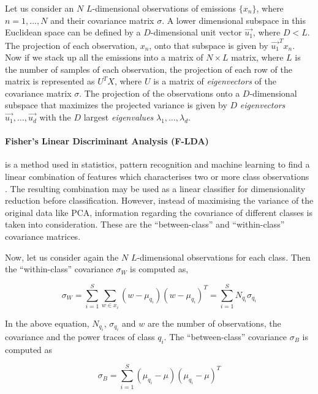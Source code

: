 \documentclass[lnicst]{svmultln}
\begin{document}
Let us consider an $N$ $L$-dimensional observations of emissions $\{x_{n}\}$, where $n=1,...,N$ and their covariance matrix $\sigma$. A lower dimensional subspace in this Euclidean space can be defined by a $D$-dimensional unit vector $\overrightarrow{u_{1}}$, where $D < L$. The projection of each observation, $x_{n}$, onto that subspace is given by $\overrightarrow{u_{1}}^{T} x_{n}$. Now if we stack up all the emissions into a matrix of $N\times L$ matrix, where $L$ is the number of samples of each observation, the projection of each row of the matrix is represented as $U^{T} X$, where $U$ is a matrix of \emph{eigenvectors} of the covariance matrix $\sigma$. The projection of the observations onto a $D$-dimensional subspace that maximizes the projected variance is given by $D$ \emph{eigenvectors}~\cite{ILA-03-GS} $\overrightarrow{u_{1}},\dots, \overrightarrow{u_{d}}$ with the $D$ largest \emph{eigenvalues} $\lambda_{1},\dots,\lambda_{d}$.

\paragraph{\textbf{Fisher's Linear Discriminant Analysis (F-LDA)}} is a method used in statistics, pattern recognition and machine learning to find a linear combination of features which characterises two or more class observations \cite{AE-36-F,CIMCA-05-MY,MSIE-11-LDS}. The resulting combination may be used as a linear classifier for dimensionality reduction before classification. However, instead of maximising the variance of the original data like PCA, information regarding the covariance of different classes is taken into consideration. These are the ``between-class'' and ``within-class'' covariance matrices. 

Now, let us consider again the $N$ $L$-dimensional observations for each class. Then the ``within-class'' covariance $\sigma_{W}$ is computed as,

\begin{equation}
\sigma_{W} = \sum \limits_{i=1}^{S} \sum \limits_{w \in x_{i}} (w - \mu_{q_{i}})(w - \mu_{q_{i}})^{T} = \sum \limits_{i=1}^{S} N_{q_{i}}\sigma_{q_{i}}
\label{equ:within-covariance}
\end{equation}

In the above equation, $N_{q_{i}}$, $\sigma_{q_{i}}$ and $w$ are the number of observations, the covariance and the power traces of class $q_{i}$. The ``between-class'' covariance $\sigma_{B}$ is computed as

\begin{equation}
\sigma_{B} = \sum \limits_{i=1}^{S} (\mu_{q_{i}} - \mu)(\mu_{q_{i}} - \mu)^{T}
\label{equ:between-covariance}
\end{equation}
\end{document}
